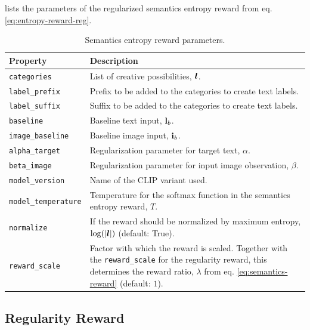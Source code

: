  lists the parameters of the regularized semantics entropy reward from eq. \eqref{eq:entropy-reward-reg}.
\begin{table}[H]
    \centering
    \begin{tabularx}{\textwidth}{C{3.9cm} L}
        \hline
        Property & Description\\
        \hline
        \texttt{categories} & List of creative possibilities, \(\bm{l}\).\\
        \texttt{label\_prefix} & Prefix to be added to the categories to create text labels.\\
        \texttt{label\_suffix} & Suffix to be added to the categories to create text labels.\\
        \texttt{baseline} & Baseline text input, \(\mathbf{l}_b\).\\
        \texttt{image\_baseline} & Baseline image input, \(\mathbf{i}_b\).\\
        \texttt{alpha\_target} & Regularization parameter for target text, \(\alpha\).\\
        \texttt{beta\_image} & Regularization parameter for input image observation, \(\beta\).\\
        \texttt{model\_version} & Name of the CLIP variant used.\\
        \texttt{model\_temperature} & Temperature for the softmax function in the semantics entropy reward, \(T\).\\
        \texttt{normalize} & If the reward should be normalized by maximum entropy, \(\log(|\bm{l}|)\) (default: True).\\
        \texttt{reward\_scale} & Factor with which the reward is scaled. Together with the \texttt{reward\_scale} for the regularity reward, this determines the reward ratio, \(\lambda\) from eq. \eqref{eq:semantics-reward} (default: \(1\)).\\
        \hline
    \end{tabularx}
    \caption{Semantics entropy reward parameters.}
    \label{tab:entropy-reward-params}
\end{table}


\subsection{Regularity Reward}
\label{sec:regularity-reward-details}

